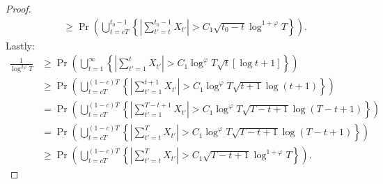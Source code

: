 \begin{proof}
\begin{align*}
    &\geq \Pr \left(\bigcup_{t=cT}^{t_0-1}\left\{\left|\sum_{t'=t}^{t_0-1} X_{t'}\right| > C_1\sqrt{t_0-t}\log^{1+\varphi} T\right\}\right). \tag{$T > t_0-t$}
\end{align*}
\normalsize
Lastly:
\scriptsize
\begin{align*}
     \frac{1}{\log^{2\varphi} T} &\geq \Pr \left(\bigcup_{t=1}^\infty\left\{\left|\sum_{t'=1}^t X_{t'}\right| > C_1\log^{\varphi}T\sqrt{t} \left[\log t + 1\right]\right\}\right) \\
     &\geq \Pr \left(\bigcup_{t=cT}^{(1-c)T}\left\{\left|\sum_{t'=1}^{t+1} X_{t'}\right| > C_1\log^{\varphi}T\sqrt{t+1}\log (t+1)\right\}\right) \\
    &= \Pr \left(\bigcup_{t=cT}^{(1-c)T}\left\{\left|\sum_{t'=1}^{T - t + 1} X_{t'}\right| > C_1\log^{\varphi}T\sqrt{T - t + 1}\log (T - t+1)\right\}\right)  \\
    &= \Pr \left(\bigcup_{t=cT}^{(1-c)T}\left\{\left|\sum_{t'=t}^{T} X_{t'}\right| > C_1\log^{\varphi}T\sqrt{T - t+1}\log (T - t+1)\right\}\right)  \tag{stationarity} \\
    &\geq \Pr \left(\bigcup_{t=cT}^{(1-c)T}\left\{\left|\sum_{t'=t}^{T} X_{t'}\right| > C_1\sqrt{T-t+1}\log^{1 + \varphi}T\right\}\right). \tag{$T > T-t+1$}
\end{align*}
\end{proof}



